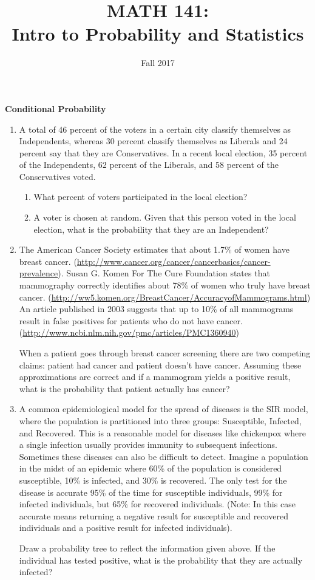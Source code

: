 \documentclass[10pt]{article}\usepackage[]{graphicx}\usepackage[]{color}
\title{MATH 141:\\Intro to Probability and Statistics}
\date{Fall 2017}
\newcommand{\ans}{\vspace{1.5in}}
\begin{document}
\textbf{Conditional Probability}

\begin{enumerate}

  \item A total of 46 percent of the voters in a certain city classify themselves as Independents, whereas 30 percent classify themselves as Liberals and 24 percent say that they are Conservatives.  In a recent local election, 35 percent of the Independents, 62 percent of the Liberals, and 58 percent of the Conservatives voted.
  \begin{enumerate}
    \itemsep1.5in
    \item What percent of voters participated in the local election?
    \item A voter is chosen at random.  Given that this person voted in the local election, what is the probability that they are an Independent?
    \ans
  \end{enumerate}
  
  \item The American Cancer Society estimates that about 1.7\% of women have breast cancer.
(\url{http://www.cancer.org/cancer/cancerbasics/cancer-prevalence}). Susan G. Komen For The Cure Foundation states that mammography correctly identifies about 78\% of women who truly have breast cancer. (\url{http://ww5.komen.org/BreastCancer/AccuracyofMammograms.html}) An article published in 2003 suggests that up to 10\% of all mammograms result in false positives for patients who do not have cancer.
(\url{http://www.ncbi.nlm.nih.gov/pmc/articles/PMC1360940})

When a patient goes through breast cancer screening there are two competing claims: patient had cancer and patient doesn't have cancer. Assuming these approximations are correct and if a mammogram yields a positive result, what is the probability that patient actually has cancer?


\newpage

\item A common epidemiological model for the spread of diseases is the SIR model, where the population is partitioned into three groups: Susceptible, Infected, and Recovered. This is a reasonable model for diseases like chickenpox where a single infection usually provides immunity to subsequent infections. Sometimes these diseases can also be difficult to detect.
Imagine a population in the midst of an epidemic where 60\% of the population is considered susceptible, 10\% is infected, and 30\% is recovered. The only test for the disease is accurate 95\% of the time for susceptible individuals, 99\% for infected individuals, but 65\% for recovered individuals. (Note: In this case accurate means returning a negative result for susceptible and recovered individuals and a positive result for infected individuals).

Draw a probability tree to reflect the information given above. If the individual has tested positive, what is the probability that they are actually infected?

\end{enumerate}
\end{document}
